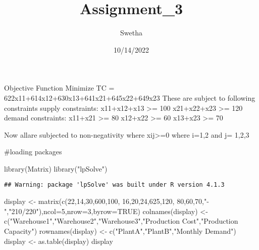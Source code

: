 \documentclass[
]{article}
\title{Assignment\_3}
\author{Swetha}
\date{10/14/2022}
\newenvironment{Shaded}{\begin{snugshade}}{\end{snugshade}}
\newcommand{\AttributeTok}[1]{\textcolor[rgb]{0.77,0.63,0.00}{#1}}
\newcommand{\ConstantTok}[1]{\textcolor[rgb]{0.00,0.00,0.00}{#1}}
\newcommand{\DecValTok}[1]{\textcolor[rgb]{0.00,0.00,0.81}{#1}}
\newcommand{\FunctionTok}[1]{\textcolor[rgb]{0.00,0.00,0.00}{#1}}
\newcommand{\NormalTok}[1]{#1}
\newcommand{\OtherTok}[1]{\textcolor[rgb]{0.56,0.35,0.01}{#1}}
\newcommand{\StringTok}[1]{\textcolor[rgb]{0.31,0.60,0.02}{#1}}
\begin{document}
\maketitle

Objective Function Minimize TC =
622x11+614x12+630x13+641x21+645x22+649x23 These are subject to following
constraints supply constraints: x11+x12+x13 \textgreater= 100
x21+x22+x23 \textgreater= 120 demand constraints: x11+x21 \textgreater=
80 x12+x22 \textgreater= 60 x13+x23 \textgreater= 70

Now allare subjected to non-negativity where xij\textgreater=0 where
i=1,2 and j= 1,2,3

\#loading packages

\begin{Shaded}
\begin{Highlighting}[]
\FunctionTok{library}\NormalTok{(Matrix)}
\FunctionTok{library}\NormalTok{(}\StringTok{"lpSolve"}\NormalTok{)}
\end{Highlighting}
\end{Shaded}

\begin{verbatim}
## Warning: package 'lpSolve' was built under R version 4.1.3
\end{verbatim}

\begin{Shaded}
\begin{Highlighting}[]
\NormalTok{display }\OtherTok{\textless{}{-}} \FunctionTok{matrix}\NormalTok{(}\FunctionTok{c}\NormalTok{(}\DecValTok{22}\NormalTok{,}\DecValTok{14}\NormalTok{,}\DecValTok{30}\NormalTok{,}\DecValTok{600}\NormalTok{,}\DecValTok{100}\NormalTok{,}
                  \DecValTok{16}\NormalTok{,}\DecValTok{20}\NormalTok{,}\DecValTok{24}\NormalTok{,}\DecValTok{625}\NormalTok{,}\DecValTok{120}\NormalTok{,}
                  \DecValTok{80}\NormalTok{,}\DecValTok{60}\NormalTok{,}\DecValTok{70}\NormalTok{,}\StringTok{"{-}"}\NormalTok{,}\StringTok{"210/220"}\NormalTok{),}\AttributeTok{ncol=}\DecValTok{5}\NormalTok{,}\AttributeTok{nrow=}\DecValTok{3}\NormalTok{,}\AttributeTok{byrow=}\ConstantTok{TRUE}\NormalTok{)}
 \FunctionTok{colnames}\NormalTok{(display) }\OtherTok{\textless{}{-}} \FunctionTok{c}\NormalTok{(}\StringTok{"Warehouse1"}\NormalTok{,}\StringTok{"Warehouse2"}\NormalTok{,}\StringTok{"Warehouse3"}\NormalTok{,}\StringTok{"Production Cost"}\NormalTok{,}\StringTok{"Production Capacity"}\NormalTok{)}
 \FunctionTok{rownames}\NormalTok{(display) }\OtherTok{\textless{}{-}} \FunctionTok{c}\NormalTok{(}\StringTok{"PlantA"}\NormalTok{,}\StringTok{"PlantB"}\NormalTok{,}\StringTok{"Monthly Demand"}\NormalTok{)}
\NormalTok{ display }\OtherTok{\textless{}{-}} \FunctionTok{as.table}\NormalTok{(display)}
\NormalTok{ display}
\end{Highlighting}
\end{Shaded}
\end{document}
